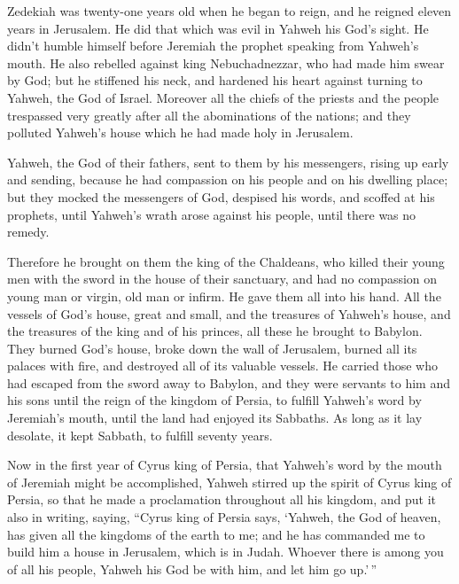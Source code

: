  Zedekiah was twenty-one years old when he began to
reign, and he reigned eleven years in Jerusalem.  He did
that which was evil in Yahweh his God's sight. He didn't humble himself
before Jeremiah the prophet speaking from Yahweh's mouth.
 He also rebelled against king Nebuchadnezzar, who had
made him swear by God; but he stiffened his neck, and hardened his heart
against turning to Yahweh, the God of Israel.  Moreover
all the chiefs of the priests and the people trespassed very greatly
after all the abominations of the nations; and they polluted Yahweh's
house which he had made holy in Jerusalem.

 Yahweh, the God of their fathers, sent to them by his
messengers, rising up early and sending, because he had compassion on
his people and on his dwelling place;  but they mocked
the messengers of God, despised his words, and scoffed at his prophets,
until Yahweh's wrath arose against his people, until there was no
remedy.

 Therefore he brought on them the king of the Chaldeans,
who killed their young men with the sword in the house of their
sanctuary, and had no compassion on young man or virgin, old man or
infirm. He gave them all into his hand.  All the vessels
of God's house, great and small, and the treasures of Yahweh's house,
and the treasures of the king and of his princes, all these he brought
to Babylon.  They burned God's house, broke down the wall
of Jerusalem, burned all its palaces with fire, and destroyed all of its
valuable vessels.  He carried those who had escaped from
the sword away to Babylon, and they were servants to him and his sons
until the reign of the kingdom of Persia,  to fulfill
Yahweh's word by Jeremiah's mouth, until the land had enjoyed its
Sabbaths. As long as it lay desolate, it kept Sabbath, to fulfill
seventy years.

 Now in the first year of Cyrus king of Persia, that
Yahweh's word by the mouth of Jeremiah might be accomplished, Yahweh
stirred up the spirit of Cyrus king of Persia, so that he made a
proclamation throughout all his kingdom, and put it also in writing,
saying,  ``Cyrus king of Persia says, `Yahweh, the God of
heaven, has given all the kingdoms of the earth to me; and he has
commanded me to build him a house in Jerusalem, which is in Judah.
Whoever there is among you of all his people, Yahweh his God be with
him, and let him go up.'\,''
